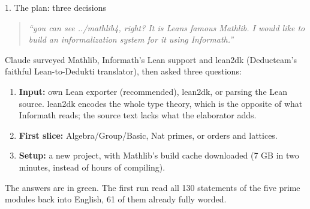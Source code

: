 \documentclass[10pt,aspectratio=169]{beamer}
\newcommand{\ok}[1]{\textcolor{good}{#1}}
\newcommand{\prompt}[1]{\begin{quote}\small\itshape ``#1''\end{quote}}
\begin{document}
\begin{frame}{1. The plan: three decisions}
  \prompt{you can see ../mathlib4, right? It is Leans famous Mathlib. I would
  like to build an informalization system for it using Informath.}
  Claude surveyed Mathlib, Informath's Lean support and lean2dk (Deducteam's
  faithful Lean-to-Dedukti translator), then asked three questions:
  \begin{enumerate}
    \item \textbf{Input:} \ok{own Lean exporter} (recommended), lean2dk, or
          parsing the Lean source. lean2dk encodes the whole type theory,
          which is the opposite of what Informath reads; the source text
          lacks what the elaborator adds.
    \item \textbf{First slice:} Algebra/Group/Basic, \ok{Nat primes}, or
          orders and lattices.
    \item \textbf{Setup:} \ok{a new project, with Mathlib's build cache
          downloaded} (7 GB in two minutes, instead of hours of compiling).
  \end{enumerate}
  The answers are in green. The first run read all 130 statements of the five
  prime modules back into English, 61 of them already fully worded.
\end{frame}
\end{document}
